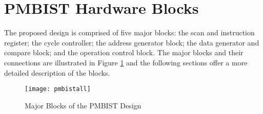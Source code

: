 \section{PMBIST Hardware Blocks}
\label{sect:bg-blocks}
The proposed design is comprised of five major blocks: the scan and instruction register; the cycle controller; the address generator block; the data generator and compare block; and the operation control block.  The major blocks and their connections are illustrated in Figure \ref{fig:pmbistall} and the following sections offer a more detailed description of the blocks.

\begin{figure}[H]
  \centering
  \texttt{[image: pmbistall]}
  \caption{Major Blocks of the PMBIST Design}
  \label{fig:pmbistall}
\end{figure}







